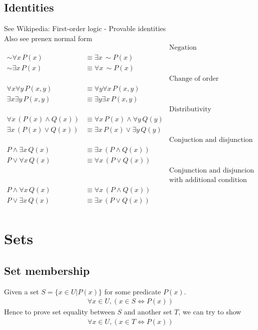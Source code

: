 \documentclass{article}
\begin{document}
\subsection{Identities}
See Wikipedia: First-order logic - Provable identities\\
Also see prenex normal form
\begin{align*}
    &&\text{Negation}\\
    \sim \forall x\, P(x)&\equiv \exists x\, \sim P(x)\\
    \sim \exists x\, P(x)&\equiv \forall x\, \sim P(x)\\
    &&\text{Change of order}\\
    \forall x\forall y\, P(x, y)&\equiv \forall y\forall x\, P(x, y)\\
    \exists x\exists y\, P(x, y)&\equiv \exists y\exists x\, P(x, y)\\
    &&\text{Distributivity}\\
    \forall x\, (P(x)\land Q(x))&\equiv \forall x\, P(x)\land \forall y\, Q(y)\\
    \exists x\, (P(x)\lor Q(x))&\equiv \exists x\, P(x) \lor \exists y\, Q(y)\\
    &&\text{Conjuction and disjunction}\\
    P\land \exists x\, Q(x)&\equiv \exists x\, (P\land Q(x))\\
    P\lor \forall x\, Q(x)&\equiv \forall x\, (P\lor Q(x))\\
    &&\text{Conjunction and disjuncion}\\
    &&\text{with additional condition that domain of x is non-empty}\\
    P\land \forall x\, Q(x)&\equiv \forall x\, (P\land Q(x))\\
    P\lor \exists x\, Q(x)&\equiv \exists x\, (P\lor Q(x))\\
\end{align*}

\section{Sets}
\subsection{Set membership}
Given a set $S=\{x\in U| P(x)\}$ for some predicate $P(x)$.
\begin{align*}
	\forall x\in U, (x\in S \iff P(x)) 
\end{align*}
Hence to prove set equality between $S$ and another set $T$, we can try to show 
\begin{align*}
	\forall x\in U, (x\in T \iff P(x))
\end{align*}
\end{document}
